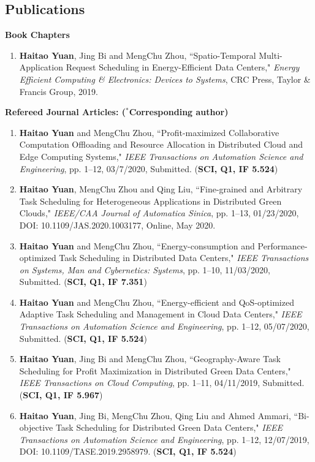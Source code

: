\documentclass[margin,line]{res}
\begin{document}
\begin{resume}
\section{\sc Publications}

{\bf {Book Chapters}}
\begin{enumerate}
\item \textbf{Haitao Yuan}, Jing Bi and MengChu Zhou, ``Spatio-Temporal Multi-Application Request Scheduling in Energy-Efficient Data Centers," \emph{Energy Efficient Computing \& Electronics: Devices to Systems}, CRC Press, Taylor \& Francis Group, 2019.
\end{enumerate}

{\bf {Refereed Journal Articles: ($^{*}$Corresponding author)}}
\begin{enumerate}
\item \textbf{Haitao Yuan} and MengChu Zhou, ``Profit-maximized Collaborative Computation Offloading and Resource Allocation in Distributed Cloud and Edge Computing Systems," \emph{IEEE Transactions on Automation Science and Engineering}, pp. 1--12, 03/7/2020, Submitted. (\textbf{SCI, Q1, IF 5.524})
\item \textbf{Haitao Yuan}, MengChu Zhou and Qing Liu, ``Fine-grained and Arbitrary Task Scheduling for Heterogeneous Applications in Distributed Green Clouds," \emph{IEEE/CAA Journal of Automatica Sinica}, pp. 1--13, 01/23/2020, DOI: 10.1109/JAS.2020.1003177, Online, May 2020.
\item \textbf{Haitao Yuan} and MengChu Zhou, ``Energy-consumption and Performance-optimized Task Scheduling in Distributed Data Centers," \emph{IEEE Transactions on Systems, Man and Cybernetics: Systems}, pp. 1--10, 11/03/2020, Submitted. (\textbf{SCI, Q1, IF 7.351})
\item \textbf{Haitao Yuan} and MengChu Zhou, ``Energy-efficient and QoS-optimized Adaptive Task Scheduling and Management in Cloud Data Centers," \emph{IEEE Transactions on Automation Science and Engineering}, pp. 1--12, 05/07/2020, Submitted. (\textbf{SCI, Q1, IF 5.524})
\item \textbf{Haitao Yuan}, Jing Bi and MengChu Zhou, ``Geography-Aware Task Scheduling for Profit Maximization in Distributed Green Data Centers," \emph{IEEE Transactions on Cloud Computing}, pp. 1--11, 04/11/2019, Submitted. (\textbf{SCI, Q1, IF 5.967})
\item \textbf{Haitao Yuan}, Jing Bi, MengChu Zhou, Qing Liu and Ahmed Ammari, ``Bi-objective Task Scheduling for Distributed Green Data Centers," \emph{IEEE Transactions on Automation Science and Engineering}, pp. 1--12, 12/07/2019, DOI: 10.1109/TASE.2019.2958979. (\textbf{SCI, Q1, IF 5.524})

\end{enumerate}
\end{resume}
\end{document}
